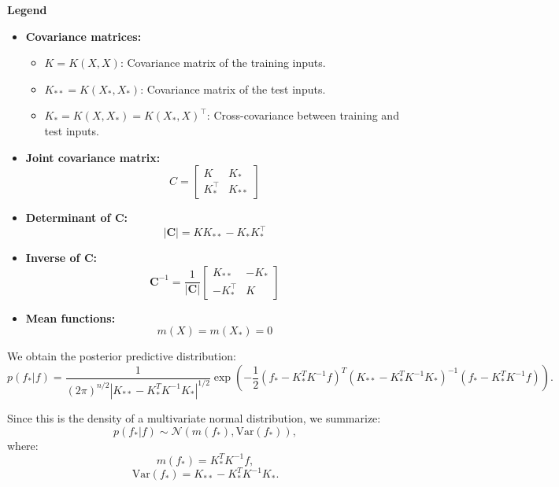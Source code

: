 \documentclass{article}
\begin{document}
\noindent
\textbf{Legend}
\begin{itemize}
    \item \textbf{Covariance matrices:}
    \begin{itemize}
        \item \( K = K(X, X) \): Covariance matrix of the training inputs.
        \item \( K_{**} = K(X_*, X_*) \): Covariance matrix of the test inputs.
        \item \( K_* = K(X, X_*) = K(X_*, X)^\top \): Cross-covariance between training and test inputs.
    \end{itemize}
    
    \item \textbf{Joint covariance matrix:}
    \[
    C = \begin{bmatrix}
    K & K_* \\
    K_*^\top & K_{**}
    \end{bmatrix}
    \]
    
    \item \textbf{Determinant of \( \mathbf{C} \):}
    \[
    |\mathbf{C}| = K K_{**} - K_* K_*^\top
    \]
    
    \item \textbf{Inverse of \( \mathbf{C} \):}
    \[
    \mathbf{C}^{-1} = \frac{1}{|\mathbf{C}|}
    \begin{bmatrix}
    K_{**} & -K_* \\
    -K_*^\top & K
    \end{bmatrix}
    \]
    
    \item \textbf{Mean functions:}
    \[
    m(X) = m(X_*) = 0
    \]
\end{itemize}



\noindent
We obtain the posterior predictive distribution:
\begin{equation}\label{eq: 1}
p(f_* | f) = \frac{1}{(2\pi)^{n/2} |K_{**} - K_*^T K^{-1} K_*|^{1/2}} 
\exp \left( 
-\frac{1}{2} 
(f_* - K_*^T K^{-1} f)^T 
(K_{**} - K_*^T K^{-1} K_*)^{-1} 
(f_* - K_*^T K^{-1} f) 
\right).
\end{equation}

\noindent
Since this is the density of a multivariate normal distribution, we summarize:
\[
p(f_* | f) \sim \mathcal{N}(m(f_*), \text{Var}(f_*)),
\]
where:
\begin{equation} \label{eq: 2}
m(f_*) = K_*^T K^{-1} f,
\end{equation}
\begin{equation} \label{eq: 3}
\text{Var}(f_*) = K_{**} - K_*^T K^{-1} K_*.
\end{equation}
\end{document}

